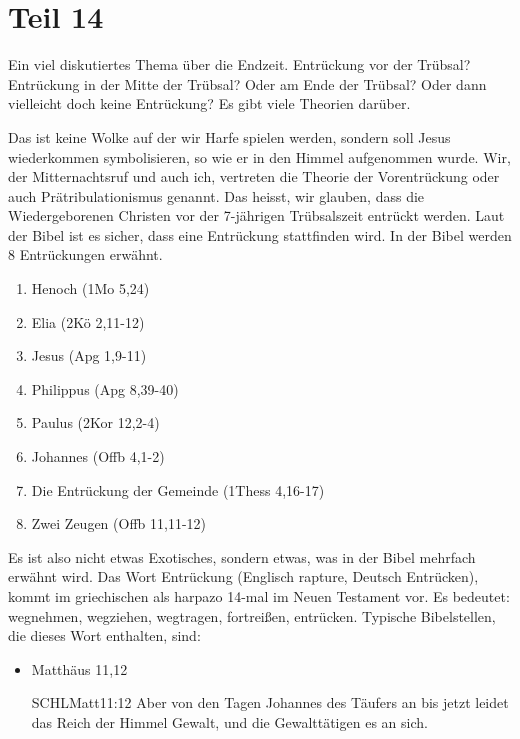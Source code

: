 \section{Teil 14}
\begin{otsblock}
        Ein viel diskutiertes Thema über die Endzeit. Entrückung vor der Trübsal? Entrückung in der Mitte der Trübsal? Oder am Ende der Trübsal? Oder dann vielleicht doch keine Entrückung? Es gibt viele Theorien darüber.

        Das ist keine Wolke auf der wir Harfe spielen werden, sondern soll Jesus wiederkommen symbolisieren, so wie er in den Himmel aufgenommen wurde.
        Wir, der Mitternachtsruf und auch ich, vertreten die Theorie der Vorentrückung oder auch Prätribulationismus genannt. Das heisst, wir glauben, dass die Wiedergeborenen Christen vor der 7-jährigen Trübsalszeit entrückt werden. Laut der Bibel ist es sicher, dass eine Entrückung stattfinden wird. In der Bibel werden 8 Entrückungen erwähnt.
        \begin{enumerate}
            \item Henoch (1Mo 5,24)
            \item Elia (2Kö 2,11-12)
            \item Jesus (Apg 1,9-11)
            \item Philippus (Apg 8,39-40)
            \item Paulus (2Kor 12,2-4)
            \item Johannes (Offb 4,1-2)
            \item Die Entrückung der Gemeinde (1Thess 4,16-17)
            \item Zwei Zeugen (Offb 11,11-12)
        \end{enumerate}
        Es ist also nicht etwas Exotisches, sondern etwas, was in der Bibel mehrfach erwähnt wird. Das Wort Entrückung (Englisch rapture, Deutsch Entrücken), kommt im griechischen als harpazo 14-mal im Neuen Testament vor. Es bedeutet: wegnehmen, wegziehen, wegtragen, fortreißen, entrücken.
        Typische Bibelstellen, die dieses Wort enthalten, sind:
        \begin{itemize}
            \item Matthäus 11,12
                  \begin{bibelbox}{SCHL}{Matt}{11:12}
                      Aber von den Tagen Johannes des Täufers an bis jetzt leidet das Reich der Himmel Gewalt, und die Gewalttätigen  es an sich.
                  \end{bibelbox}

\end{itemize}
\end{otsblock}
